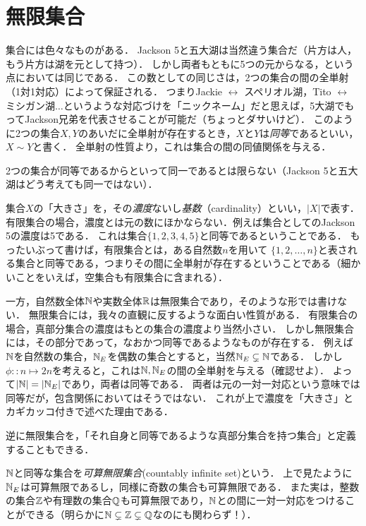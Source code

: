 \documentclass[dvipdfmx, 11pt,a4paper]{jsarticle}
\begin{document}
\section{無限集合}
集合には色々なものがある．
Jackson 5と五大湖は当然違う集合だ（片方は人，もう片方は湖を元として持つ）．
しかし両者もともに5つの元からなる，という点においては同じである．
この数としての同じさは，2つの集合の間の全単射（1対1対応）によって保証される．
つまりJackie $\leftrightarrow$ スペリオル湖，Tito $\leftrightarrow$ ミシガン湖$\dots$というような対応づけを「ニックネーム」だと思えば，5大湖でもってJackson兄弟を代表させることが可能だ（ちょっとダサいけど）．
このように2つの集合$X, Y$のあいだに全単射が存在するとき，$X$と$Y$は\emph{同等}であるといい，$X \sim Y$と書く．
全単射の性質より，これは集合の間の同値関係を与える．

\begin{attn}
 2つの集合が同等であるからといって同一であるとは限らない（Jackson 5と五大湖はどう考えても同一ではない）．
\end{attn}

集合$X$の「大きさ」を，その\emph{濃度}ないし\emph{基数}（cardinality）といい，$|X|$で表す．
有限集合の場合，濃度とは元の数にほかならない．例えば集合としてのJackson 5の濃度は5である．
これは集合$\{1, 2, 3, 4, 5\}$と同等であるということである．
もったいぶって書けば，有限集合とは，ある自然数$n$を用いて $\{1, 2, \dots, n\}$と表される集合と同等である，つまりその間に全単射が存在するということである（細かいことをいえば，空集合も有限集合に含まれる）．

一方，自然数全体$\mathbb{N}$や実数全体$\mathbb{R}$は無限集合であり，そのような形では書けない．
無限集合には，我々の直観に反するような面白い性質がある．
有限集合の場合，真部分集合の濃度はもとの集合の濃度より当然小さい．
しかし無限集合には，その部分であって，なおかつ同等であるようなものが存在する．
例えば$\mathbb{N}$を自然数の集合，$\mathbb{N}_E$を偶数の集合とすると，当然$\mathbb{N}_E \subsetneq \mathbb{N}$である．
しかし$\phi::n \mapsto 2n$を考えると，これは$\mathbb{N}, \mathbb{N}_E$の間の全単射を与える（確認せよ）．
よって$|\mathbb{N}| = |\mathbb{N}_E|$であり，両者は同等である．
両者は元の一対一対応という意味では同等だが，包含関係においてはそうではない．
これが上で濃度を「大きさ」とカギカッコ付きで述べた理由である．

逆に無限集合を，「それ自身と同等であるような真部分集合を持つ集合」と定義することもできる．

$\mathbb{N}$と同等な集合を\emph{可算無限集合}(countably infinite set)という．
上で見たように$\mathbb{N}_E$は可算無限であるし，同様に奇数の集合も可算無限である．
また実は，整数の集合$\mathbb{Z}$や有理数の集合$\mathbb{Q}$も可算無限であり，$\mathbb{N}$との間に一対一対応をつけることができる（明らかに$\mathbb{N} \subsetneq \mathbb{Z} \subsetneq \mathbb{Q}$なのにも関わらず！）．
\end{document}
